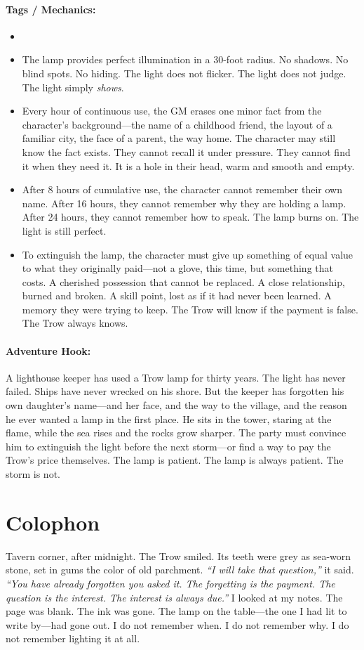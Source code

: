 \paragraph{Tags / Mechanics:}
\begin{itemize}
\item [LIGHT] [CURSE] [SILENCE] [SECRET]
\item The lamp provides perfect illumination in a 30-foot radius. No shadows. No blind spots. No hiding. The light does not flicker. The light does not judge. The light simply \textit{shows}.
\item Every hour of continuous use, the GM erases one minor fact from the character's background—the name of a childhood friend, the layout of a familiar city, the face of a parent, the way home. The character may still know the fact exists. They cannot recall it under pressure. They cannot find it when they need it. It is a hole in their head, warm and smooth and empty.
\item After 8 hours of cumulative use, the character cannot remember their own name. After 16 hours, they cannot remember why they are holding a lamp. After 24 hours, they cannot remember how to speak. The lamp burns on. The light is still perfect.
\item To extinguish the lamp, the character must give up something of equal value to what they originally paid—not a glove, this time, but something that costs. A cherished possession that cannot be replaced. A close relationship, burned and broken. A skill point, lost as if it had never been learned. A memory they were trying to keep. The Trow will know if the payment is false. The Trow always knows.
\end{itemize}

\paragraph{Adventure Hook:}
A lighthouse keeper has used a Trow lamp for thirty years. The light has never failed. Ships have never wrecked on his shore. But the keeper has forgotten his own daughter's name—and her face, and the way to the village, and the reason he ever wanted a lamp in the first place. He sits in the tower, staring at the flame, while the sea rises and the rocks grow sharper. The party must convince him to extinguish the light before the next storm—or find a way to pay the Trow's price themselves. The lamp is patient. The lamp is always patient. The storm is not.

\section*{Colophon}
Tavern corner, after midnight. The Trow smiled. Its teeth were grey as sea-worn stone, set in gums the color of old parchment. \textit{``I will take that question,''} it said. \textit{``You have already forgotten you asked it. The forgetting is the payment. The question is the interest. The interest is always due.''} I looked at my notes. The page was blank. The ink was gone. The lamp on the table—the one I had lit to write by—had gone out. I do not remember when. I do not remember why. I do not remember lighting it at all.